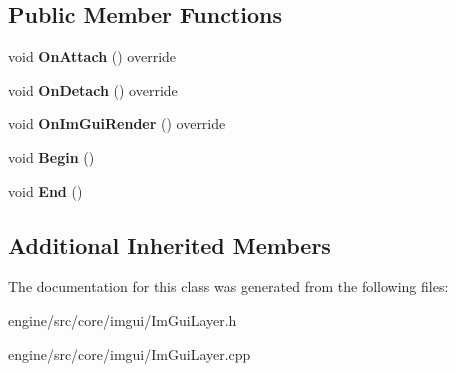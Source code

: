 \subsection*{Public Member Functions}
\begin{DoxyCompactItemize}
\item
\mbox{\label{classengine_1_1imgui_1_1ImGuiLayer_ab3820ce44fcc9471f14c905510848f3e}}
void {\bfseries On\+Attach} () override
\item
\mbox{\label{classengine_1_1imgui_1_1ImGuiLayer_af84a7c8e766167706345754587ced38e}}
void {\bfseries On\+Detach} () override
\item
\mbox{\label{classengine_1_1imgui_1_1ImGuiLayer_aaa2388f874b2ede821ec8ba4f8642900}}
void {\bfseries On\+Im\+Gui\+Render} () override
\item
\mbox{\label{classengine_1_1imgui_1_1ImGuiLayer_a246081f496037b22475d76e3a9897ac9}}
void {\bfseries Begin} ()
\item
\mbox{\label{classengine_1_1imgui_1_1ImGuiLayer_a7ad4c7169268bc19745b50b00282c9a9}}
void {\bfseries End} ()
\end{DoxyCompactItemize}
\subsection*{Additional Inherited Members}


The documentation for this class was generated from the following files\+:\begin{DoxyCompactItemize}
\item
engine/src/core/imgui/Im\+Gui\+Layer.\+h\item
engine/src/core/imgui/Im\+Gui\+Layer.\+cpp\end{DoxyCompactItemize}
